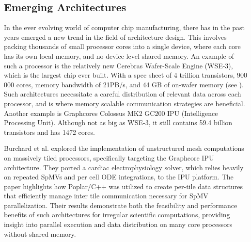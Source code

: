 \subsection{Emerging Architectures}
In the ever evolving world of computer chip manufacturing, there has in the past years emerged a new trend in the field of architecture design. This involves packing thousands of small processor cores into a single device, where each core has its own local memory, and no device level shared memory. An example of such a processor is the relatively new Cerebras Wafer-Scale Engine (WSE-3), which is the largest chip ever built. With a spec sheet of 4 trillion transistors, 900 000 cores, memory bandwidth of 21PB/s, and 44 GB of on-wafer memory (see \cite{cerebras2024wse3}). Such architectures necessitate a careful distribution of relevant data across each processor, and is where memory scalable communication strategies are beneficial. Another example is Graphcores Colossus MK2 GC200 IPU (Intelligence Processing Unit). Although not as big as WSE-3, it still contains 59.4 billion transistors and has 1472 cores.
\medskip

Burchard et al. \cite{10.3389/fphy.2023.979699} explored the implementation of unstructured mesh computations on massively tiled processors, specifically targeting the Graphcore IPU architecture. They ported a cardiac electrophysiology solver, which relies heavily on repeated SpMVs and per cell ODE integrations, to the IPU platform. The paper highlights how Poplar/C++ was utilized to create per-tile data structures that efficiently manage inter tile communication necessary for SpMV parallelization. Their results demonstrate both the feasibility and performance benefits of such architectures for irregular scientific computations, providing insight into parallel execution and data distribution on many core processors without shared memory.

